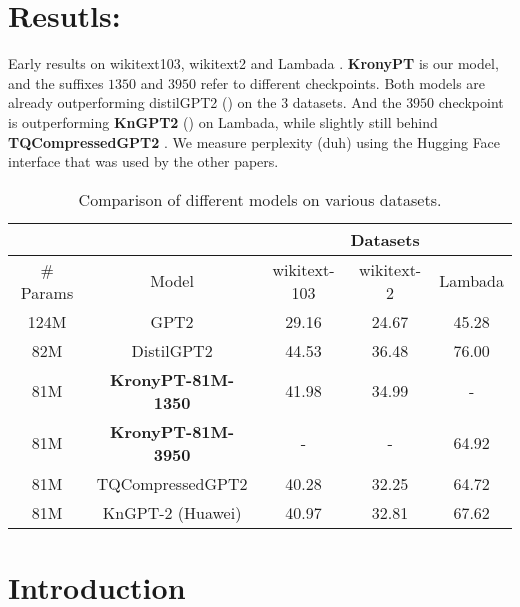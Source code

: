 \documentclass{article}
\begin{document}
\newpage

\tableofcontents
\newpage

\section{Resutls:}%
\label{sec:Resutls}

Early results on wikitext103, wikitext2 \cite{merity2016pointer} and Lambada \cite{paperno2016lambada}. \textbf{KronyPT} is our model, and the suffixes $1350$ and $3950$ refer to different checkpoints. Both models are already outperforming distilGPT2 (\cite{sanh2019distilbert}) on the 3 datasets. And the $3950$ checkpoint is outperforming \textbf{KnGPT2} (\cite{tahaei2022kroneckerbert}) on Lambada, while slightly still behind \textbf{TQCompressedGPT2}  \cite{abronin2024tqcompressor}. We measure perplexity (duh) using the Hugging Face interface that was used by the other papers.

\begin{table}[h]
\centering
\begin{tabular}{|c|c|c|c|c|}
\hline

 & & \multicolumn{3}{c|}{Datasets} \\ \hline
\# Params &  Model            & wikitext-103 & wikitext-2 & Lambada \\ \hline
124M      & GPT2              & 29.16        & 24.67      & 45.28      \\ \hline
82M       & DistilGPT2        & 44.53        & 36.48      & 76.00      \\ \hline
81M       & \textbf{KronyPT-81M-1350}  & 41.98        & 34.99      & -          \\ \hline
81M       & \textbf{KronyPT-81M-3950}  & -            & -          & 64.92      \\ \hline
81M       & TQCompressedGPT2  & 40.28        & 32.25      & 64.72      \\ \hline
81M       & KnGPT-2 (Huawei)  & 40.97        & 32.81      & 67.62      \\ \hline
\end{tabular}
\caption{Comparison of different models on various datasets.}
\end{table}



\section{Introduction}
\label{sec:Introduction}
\end{document}
